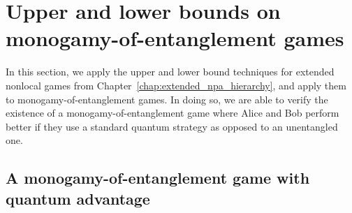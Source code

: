 \section[Upper and lower bounds on monogamy-of-entanglement games]{Upper and lower bounds on \\ monogamy-of-entanglement games} \label{sec:upper-and-lower-bounds-moe-games}

In this section, we apply the upper and lower bound techniques for extended nonlocal games from Chapter~\ref{chap:extended_npa_hierarchy}, and apply them to monogamy-of-entanglement games. In doing so, we are able to verify the existence of a monogamy-of-entanglement game where Alice and Bob perform better if they use a standard quantum strategy as opposed to an unentangled one. 


\subsection[A monogamy-of-entanglement game with quantum advantage]{A monogamy-of-entanglement game with \\ quantum advantage} \label{sec:MUB-4-3}

